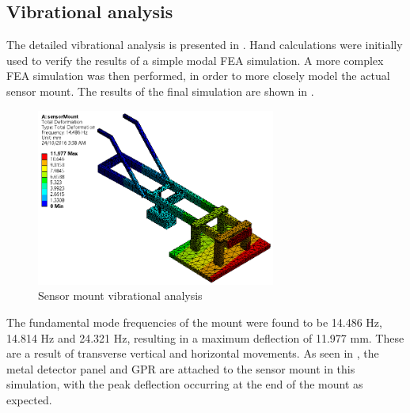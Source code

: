 \documentclass[main.tex]{subfiles}
\begin{document}
\subsection{Vibrational analysis}
The detailed vibrational analysis is presented in . Hand calculations were initially used to verify the results of a simple modal FEA simulation. A more complex FEA simulation was then performed, in order to more closely model the actual sensor mount. The results of the final simulation are shown in . 

\begin{figure}[ht]
\includegraphics[width=0.7\textwidth]{4-DetailedDesign/vibrations.PNG}
\centering
\caption{Sensor mount vibrational analysis} 
\end{figure} 

The fundamental mode frequencies of the mount were found to be 14.486 Hz, 14.814 Hz and 24.321 Hz, resulting in a maximum deflection of 11.977 mm. These are a result of transverse vertical and horizontal movements. As seen in , the metal detector panel and GPR are attached to the sensor mount in this simulation, with the peak deflection occurring at the end of the mount as expected. 
\end{document}
